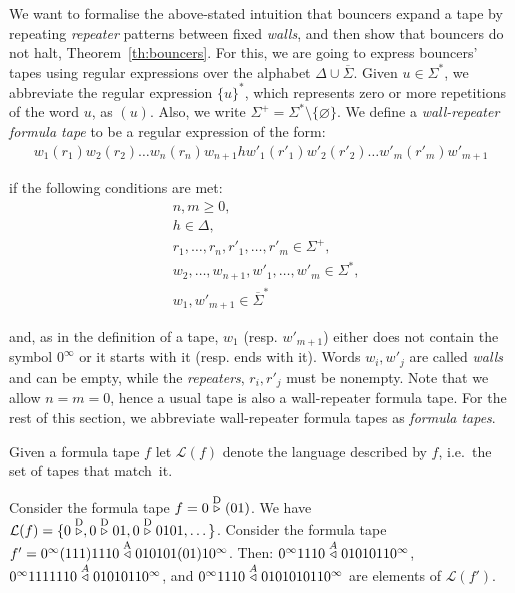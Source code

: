 We want to formalise the above-stated intuition that bouncers expand a tape by repeating \textit{repeater} patterns between fixed \textit{walls}, and then show that bouncers do not halt, Theorem~\ref{th:bouncers}. For this, we are going to express bouncers' tapes using regular expressions over the alphabet $\Delta \cup  \overline{\Sigma}$. Given $u\in\Sigma^*$, we abbreviate the regular expression $\{u\}^*$, which represents zero or more repetitions of the word $u$, as $(u)$. Also, we write $\Sigma^+ = \Sigma^* \setminus \{ \varnothing \}$. We define a \textit{wall-repeater formula tape} to be a regular expression of the form:
\begin{align}\label{math:formulaTapes}w_1(r_1)w_2(r_2)\dots w_n(r_n) w_{n+1} h w'_1(r'_1)w'_2(r'_2)\dots w'_m(r'_m) w'_{m+1}\end{align}

if the following conditions are met:
\begin{align*}
     & n,m \geq 0,                                     \\
     & h \in \Delta,                                   \\
     & r_1,\dots,r_n,r'_1,\dots,r'_m \in \Sigma^+,     \\
     & w_2,\dots,w_{n+1},w'_1,\dots,w'_m \in \Sigma^*, \\
     & w_1, w'_{m+1} \in  \overline{\Sigma}^*
\end{align*}

and, as in the definition of a tape, $w_1$ (resp. $w'_{m+1}$) either does not contain the symbol $0^\infty$ or it starts with it (resp. ends with it). Words $w_i, w'_j$ are called \textit{walls} and can be empty, while the \textit{repeaters}, $r_i, r'_j$ must be nonempty. Note that we allow $n=m=0$, hence a usual tape is also a wall-repeater formula tape. For the rest of this section, we abbreviate wall-repeater formula tapes as \textit{formula tapes}.

Given a formula tape $f$ let $\mathcal{L}(f)$ denote the language described by $f$, i.e.\ the set of tapes that match~it.

\begin{example}\label{ex:formulaTapes}
    Consider the formula tape $f = 0 \stackrel{\text{D}}\triangleright (01)$. We have $\mathcal{L}(f) = \{0\stackrel{\text{D}}\triangleright,0\stackrel{\text{D}}\triangleright01,0\stackrel{\text{D}}\triangleright0101,\dots\}$. Consider the formula tape $f'=0^\infty(111)1110 \stackrel{\text{A}}\triangleleft 010101(01)10^\infty$. Then: $0^\infty 1110 \stackrel{A}\triangleleft 01010110^\infty$, $0^\infty 1111110 \stackrel{A}\triangleleft 01010110^\infty$, and $0^\infty 1110 \stackrel{A}\triangleleft 0101010110^\infty$ are elements of $\mathcal{L}(f')$.
\end{example}

